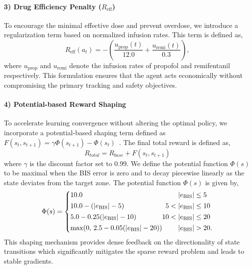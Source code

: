 \documentclass[pdflatex,sn-mathphys-num]{sn-jnl}%
\theoremstyle{thmstyleone}%
\theoremstyle{thmstyletwo}%
\theoremstyle{thmstylethree}%
\begin{document}
\paragraph{3) Drug Efficiency Penalty ($R_{\text{eff}}$)}
To encourage the minimal effective dose and prevent overdose, we introduce a regularization term based on normalized infusion rates. This term is defined as,
\begin{equation}
    R_{\text{eff}}(a_t) = -\left( \frac{u_{\text{prop}}(t)}{12.0} + \frac{u_{\text{remi}}(t)}{0.3} \right), %
\end{equation}
where $u_{\text{prop}}$ and $u_{\text{remi}}$ denote the infusion rates of propofol and remifentanil respectively. This formulation ensures that the agent acts economically without compromising the primary tracking and safety objectives.

\paragraph{4) Potential-based Reward Shaping}
To accelerate learning convergence without altering the optimal policy, we incorporate a potential-based shaping term defined as $F(s_t, s_{t+1}) = \gamma \Phi(s_{t+1}) - \Phi(s_t)$~\citep{ng_99_poli}. The final total reward is defined as,
\begin{equation}
\boxed{R_{total} = R_{base} + F(s_t, s_{t+1})}
\end{equation}
where $\gamma$ is the discount factor set to 0.99. We define the potential function $\Phi(s)$ to be maximal when the BIS error is zero and to decay piecewise linearly as the state deviates from the target zone. The potential function $\Phi(s)$ is given by,
\begin{equation}
\Phi(s)=
\left\{
\begin{array}{@{} l @{} r @{\;} c @{\;} c @{\;} c @{\;} l @{}}
    10.0 
    & \phantom{5} & \phantom{<} & |e_{\text{BIS}}| & \le & 5 \\[4pt]
    10.0-(|e_{\text{BIS}}|-5) 
    & 5 & < & |e_{\text{BIS}}| & \le & 10 \\[4pt]
    5.0-0.25(|e_{\text{BIS}}|-10) 
    & 10 & < & |e_{\text{BIS}}| & \le & 20 \\[4pt]
    \max\!\left(0,\,2.5-0.05(|e_{\text{BIS}}|-20)\right) 
    & \phantom{5} & \phantom{<} & |e_{\text{BIS}}| & > & 20.
\end{array}
\right.
\end{equation}
This shaping mechanism provides dense feedback on the directionality of state transitions which significantly mitigates the sparse reward problem and leads to stable gradients.
\end{document}
